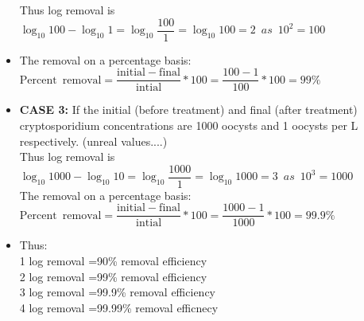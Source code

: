 \begin{itemize}
Thus log removal is $\log_{10} 100 - \log_{10} 1 = \log_{10}\dfrac{100}{1}=\log_{10} 100 = \boxed{2} \enspace as \enspace 10^2=100 $\\
\vspace{0.3cm}
\item The removal on a percentage basis: $\mathrm{Percent \enspace removal} = \dfrac{\mathrm{initial}-\mathrm{final}}{\mathrm{intial}}*100=\dfrac{100-1}{100}*100=99\%$\\
\vspace{0.5cm}
\item \textbf{CASE 3: } If the initial (before treatment) and final (after treatment) cryptosporidium concentrations are 1000 oocysts and 1 oocysts per L respectively. (unreal values....) \\
\vspace{0.3cm}
Thus log removal is $\log_{10} 1000 - \log_{10} 10 = \log_{10}\dfrac{1000}{1}=\log_{10} 1000 = \boxed{3} \enspace as \enspace 10^3=1000 $\\
\vspace{0.3cm}
The removal on a percentage basis: $\mathrm{Percent \enspace removal} = \dfrac{\mathrm{initial}-\mathrm{final}}{\mathrm{intial}}*100=\dfrac{1000-1}{1000}*100=99.9\%$
\vspace{0.3cm}
\item Thus:\\
1 log removal =90\% removal efficiency\\
2 log removal =99\% removal efficiency\\
3 log removal =99.9\% removal efficiency\\
4 log removal =99.99\% removal efficnecy\\
\end{itemize}
